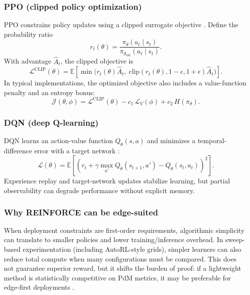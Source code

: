 \documentclass[sn-basic]{sn-jnl} %
\begin{document}
\subsubsection{PPO (clipped policy optimization)}
PPO constrains policy updates using a clipped surrogate objective \cite{Schulman2017}. Define the probability ratio
\begin{equation}
 r_t(\theta)=\frac{\pi_\theta(a_t\mid s_t)}{\pi_{\theta_{\mathrm{old}}}(a_t\mid s_t)}.
\end{equation}
With advantage $\hat{A}_t$, the clipped objective is
\begin{equation}
\mathcal{L}^{\mathrm{CLIP}}(\theta)=\mathbb{E}\left[\min\Big(r_t(\theta)\hat{A}_t,\;\mathrm{clip}(r_t(\theta),1-\epsilon,1+\epsilon)\hat{A}_t\Big)\right].
\end{equation}
In typical implementations, the optimized objective also includes a value-function penalty and an entropy bonus:
\begin{equation}
\mathcal{J}(\theta,\phi)=\mathcal{L}^{\mathrm{CLIP}}(\theta) - c_1\,\mathcal{L}_V(\phi) + c_2\,H(\pi_\theta).
\end{equation}

\subsubsection{DQN (deep Q-learning)}
DQN learns an action-value function $Q_\theta(s,a)$ and minimizes a temporal-difference error with a target network \cite{Mnih2015}:
\begin{equation}
\mathcal{L}(\theta)=\mathbb{E}\left[\left(r_t + \gamma\max_{a'}Q_{\bar\theta}(s_{t+1},a') - Q_\theta(s_t,a_t)\right)^2\right].
\end{equation}
Experience replay and target-network updates stabilize learning, but partial observability can degrade performance without explicit memory.

\subsubsection{Why REINFORCE can be edge-suited}
When deployment constraints are first-order requirements, algorithmic simplicity can translate to smaller policies and lower training/inference overhead. In sweep-based experimentation (including AutoRL-style grids), simpler learners can also reduce total compute when many configurations must be compared. This does not guarantee superior reward, but it shifts the burden of proof: if a lightweight method is statistically competitive on PdM metrics, it may be preferable for edge-first deployments \cite{Schwartz2020, Njor2024}.
\end{document}
